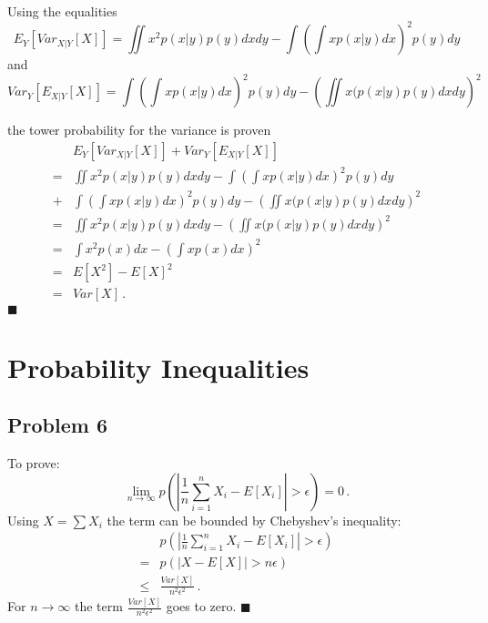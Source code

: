 \documentclass{scrartcl}
\newcommand{\qed}{\hfill $\blacksquare$}
\begin{document}
Using the equalities
\begin{equation}
	E_Y\left[Var_{X|Y}\left[X\right]\right] = \iint x^2 p(x|y)p(y)dxdy - \int \left(\int x p(x|y)dx\right)^2p(y)dy
\end{equation}
and 
\begin{equation}
	Var_Y\left[E_{X|Y}\left[X\right]\right] = \int \left(\int x p(x|y)dx\right)^2p(y)dy - \left(\iint x(p(x|y)p(y)dx dy\right)^2
\end{equation}

the tower probability for the variance is proven
\begin{eqnarray}
& E_Y\left[Var_{X|Y}\left[X\right]\right] + Var_Y\left[E_{X|Y}\left[X\right]\right]\\ 
=& \iint x^2 p(x|y)p(y)dxdy - \int \left(\int x p(x|y)dx\right)^2p(y)dy\\
+& \int \left(\int x p(x|y)dx\right)^2p(y)dy - \left(\iint x(p(x|y)p(y)dx dy\right)^2\\
=& \iint x^2 p(x|y)p(y)dxdy - \left(\iint x(p(x|y)p(y)dx dy\right)^2\\
=& \int x^2p(x)dx - \left(\int xp(x)dx\right)^2\\
=& E\left[X^2\right] - E\left[X\right]^2\\
=& Var\left[X\right] \, .
\end{eqnarray}
\qed
	
\section{Probability Inequalities} %
\label{cha:probability_inequalities}

\subsection{Problem 6} %
\label{sec:problem_6}

To prove:
\begin{equation}
	\lim_{n\to\infty} p\left(\left|\frac{1}{n} \sum\limits_{i=1}^{n}X_i - E\left[X_i\right]\right| > \epsilon \right) = 0 \, .
\end{equation}
Using $X = \sum X_i$ the term can be bounded by Chebyshev’s inequality:
\begin{eqnarray}
		&p\left(\left|\frac{1}{n} \sum\limits_{i=1}^{n}X_i - E\left[X_i\right]\right| > \epsilon \right)\\
		=&p\left(\left|X - E\left[X\right]\right| > n\epsilon \right)\\
		\le& \frac{Var\left[X\right]}{n^2\epsilon^2} \, .
\end{eqnarray}
For $n\to\infty$ the term $\frac{Var\left[X\right]}{n^2\epsilon^2}$ goes to zero. \qed
\end{document}

